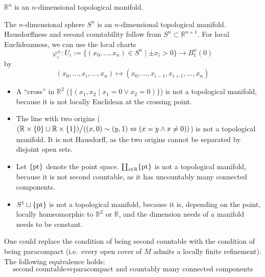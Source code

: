 \documentclass[a4paper,11pt]{article}
\begin{document}
\begin{example}
    \(\mathbb{R}^n\) is an \(n\)-dimensional topological manifold.
\end{example}

\begin{example}\label{sphere chart}
    The \(n\)-dimensional sphere \(S^n\) is an \(n\)-dimensional topological manifold. Hausdorffness and second countability follow from \(S^n\subset \mathbb{R}^{n+1}\). For local Euclideanness, we can use the local charts \[\varphi_i^\pm:U_i:=\{(x_0,\dots,x_n)\in S^n\mid \pm x_i>0\}\to B_1^n(0)\] by \[(x_0,\dots,x_i,\dots,x_n)\mapsto(x_0,\dots,x_{i-1},x_{i+1},\dots,x_n)\]
\end{example}

\begin{nonexs}
    \begin{itemize}
        \item A \enquote{cross} in \(\mathbb{R}^2\) (\(\{(x_1,x_2\mid x_1=0 \lor x_2=0)\}\)) is not a topological manifold, because it is not locally Euclidean at the crossing point. 
        \item The line with two origins (\((\mathbb{R}\times\{0\}\sqcup\mathbb{R}\times\{1\})\big/((x,0)\sim(y,1)\Leftrightarrow (x=y \land x\neq 0))\)) is not a topological manifold. It is not Hausdorff, as the two origins cannot be separated by disjoint open sets.
        \item Let \(\{\mathrm{pt}\}\) denote the point space. \(\coprod_{i\in \mathbb{R}}\{\mathrm{pt}\}\) is not a topological manifold, because it is not second countable, as it has uncountably many connected components.
        \item \(S^1\sqcup\{\mathrm{pt}\}\) is not a topological manifold, because it is, depending on the point, locally homeomorphic to \(\mathbb{R}^2\) or \(\mathbb{R}\), and the dimension needs of a manifold needs to be constant.
    \end{itemize}
\end{nonexs}

\begin{remark}
    One could replace the condition of being second countable with the condition of being paracompact (i.e.\ every open cover of \(M\) admits a locally finite refinement). The following equivalence holds:
    \[\text{second countable}\iff \text{paracompact and countably many connected components}\]
\end{remark}
\end{document}
